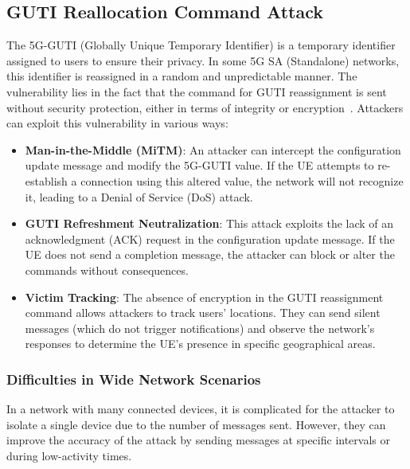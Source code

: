\documentclass[english]{article}
\begin{document}
\subsection{GUTI Reallocation Command Attack}
The 5G-GUTI (Globally Unique Temporary Identifier) is a temporary identifier
assigned to users to ensure their privacy. In some 5G SA (Standalone) networks,
this identifier is reassigned in a random and unpredictable manner. The
vulnerability lies in the fact that the command for GUTI reassignment is sent
without security protection, either in terms of integrity or
encryption~\cite{eleftherakis2024demystifying}. Attackers can exploit this
vulnerability in various ways:
\begin{itemize}
	\item \textbf{Man-in-the-Middle (MiTM)}:
	      An attacker can intercept the configuration update message
	      and modify the 5G-GUTI value. If the UE attempts to re-establish
	      a connection using this altered value, the network will not recognize
	      it, leading to a Denial of Service (DoS) attack.
	\item \textbf{GUTI Refreshment Neutralization}:
	      This attack exploits the lack of an acknowledgment (ACK)
	      request in the configuration update message. If the UE does
	      not send a completion message, the attacker can block or alter
	      the commands without consequences.
	\item \textbf{Victim Tracking}:
	      The absence of encryption in the GUTI reassignment command
	      allows attackers to track users' locations. They can send
	      silent messages (which do not trigger notifications) and
	      observe the network's responses to determine the UE's
	      presence in specific geographical areas.
\end{itemize}

\subsubsection{Difficulties in Wide Network Scenarios}
In a network with many connected devices, it is complicated for the attacker to
isolate a single device due to the number of messages sent. However, they can
improve the accuracy of the attack by sending messages at specific intervals or
during low-activity times.
\end{document}
